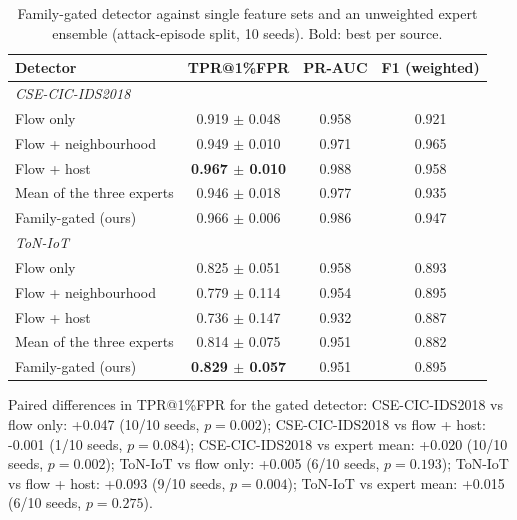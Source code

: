 \begin{table}[t]
\centering
\small
\caption{Family-gated detector against single feature sets and an unweighted expert ensemble (attack-episode split, 10 seeds). Bold: best per source.}
\label{tab:gated}
\begin{tabular}{lccc}
\toprule
Detector & TPR@1\%FPR & PR-AUC & F1 (weighted) \\
\midrule
\multicolumn{4}{l}{\textit{CSE-CIC-IDS2018}} \\
\quad Flow only & 0.919 $\pm$ 0.048 & 0.958 & 0.921 \\
\quad Flow + neighbourhood & 0.949 $\pm$ 0.010 & 0.971 & 0.965 \\
\quad Flow + host & \textbf{0.967 $\pm$ 0.010} & 0.988 & 0.958 \\
\quad Mean of the three experts & 0.946 $\pm$ 0.018 & 0.977 & 0.935 \\
\quad Family-gated (ours) & 0.966 $\pm$ 0.006 & 0.986 & 0.947 \\
\multicolumn{4}{l}{\textit{ToN-IoT}} \\
\quad Flow only & 0.825 $\pm$ 0.051 & 0.958 & 0.893 \\
\quad Flow + neighbourhood & 0.779 $\pm$ 0.114 & 0.954 & 0.895 \\
\quad Flow + host & 0.736 $\pm$ 0.147 & 0.932 & 0.887 \\
\quad Mean of the three experts & 0.814 $\pm$ 0.075 & 0.951 & 0.882 \\
\quad Family-gated (ours) & \textbf{0.829 $\pm$ 0.057} & 0.951 & 0.895 \\
\bottomrule
\end{tabular}
\par\smallskip\parbox{\linewidth}{\footnotesize Paired differences in TPR@1\%FPR for the gated detector: CSE-CIC-IDS2018 vs flow only: +0.047 (10/10 seeds, $p=0.002$); CSE-CIC-IDS2018 vs flow + host: -0.001 (1/10 seeds, $p=0.084$); CSE-CIC-IDS2018 vs expert mean: +0.020 (10/10 seeds, $p=0.002$); ToN-IoT vs flow only: +0.005 (6/10 seeds, $p=0.193$); ToN-IoT vs flow + host: +0.093 (9/10 seeds, $p=0.004$); ToN-IoT vs expert mean: +0.015 (6/10 seeds, $p=0.275$).}
\end{table}
